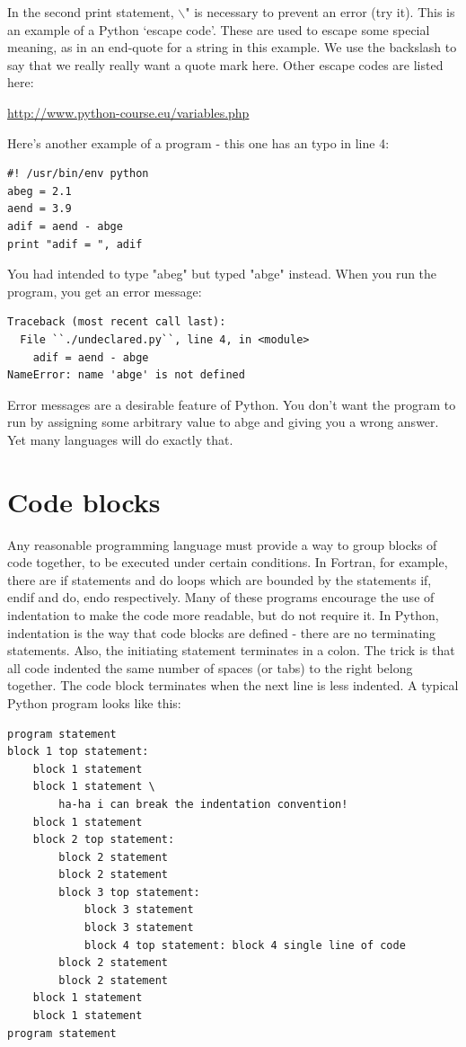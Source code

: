 \documentclass[11pt]{book}
\begin{document}
{{{{\noindent
In the second print statement, $\backslash$" is necessary to prevent an error (try it).   This is an example of a Python `escape code'.   These are used to escape some special meaning, as in an end-quote for a string in this example. We use the backslash to say that we really really want a quote mark here. Other escape codes are listed here:

\url{http://www.python-course.eu/variables.php}

Here's another example of a program - this one has an typo in line 4:

{ \color{blue} \begin{verbatim}
#! /usr/bin/env python
abeg = 2.1
aend = 3.9
adif = aend - abge
print "adif = ", adif
\end{verbatim}}

\noindent
You had intended to type "abeg" but typed "abge" instead.  When
you run the program, you get an error message:

{ \color{blue} \begin{verbatim}
Traceback (most recent call last):
  File ``./undeclared.py``, line 4, in <module>
    adif = aend - abge
NameError: name 'abge' is not defined
\end{verbatim}}

\noindent
Error messages are a desirable feature of Python.  You don't want the program
to run by assigning some arbitrary value to abge and giving you
a wrong answer.  Yet many languages will do exactly that.


\section{Code blocks}
Any reasonable programming language must provide a way to group blocks of code together, to be executed under certain conditions.  In Fortran, for example, there are if statements and do loops which are bounded by the statements if, endif and do, endo respectively.  Many of these programs encourage the use of indentation to make the code more readable, but do not require it.  In Python, indentation is the way that code blocks are defined - there are no terminating statements. Also, the initiating statement terminates in a colon.  The trick is that all code indented the same number of spaces (or tabs) to the right belong together.  The code block terminates when the next line is less indented.     A typical Python program looks like this:

{ \color{blue}\begin {verbatim}
program statement
block 1 top statement:
    block 1 statement
    block 1 statement \
        ha-ha i can break the indentation convention!
    block 1 statement
    block 2 top statement:
        block 2 statement
        block 2 statement
        block 3 top statement:
            block 3 statement
            block 3 statement
            block 4 top statement: block 4 single line of code
        block 2 statement
        block 2 statement
    block 1 statement
    block 1 statement
program statement
\end{verbatim}}


}}}}
\end{document}
